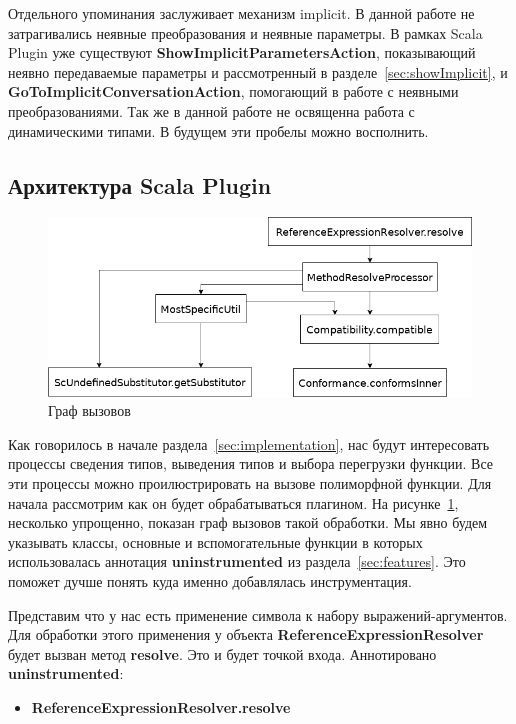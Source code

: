 Отдельного упоминания заслуживает механизм implicit.
В данной работе не затрагивались неявные преобразования и неявные параметры.
В рамках Scala Plugin уже существуют \textbf{ShowImplicitParametersAction},
показывающий неявно передаваемые параметры и рассмотренный в
разделе~\ref{sec:showImplicit}, и \textbf{GoToImplicitConversationAction},
помогающий в работе с неявными преобразованиями.
Так же в данной работе не освященна работа с динамическими типами.
В будущем эти пробелы можно восполнить.

\subsection{Архитектура Scala Plugin}
\label{sec:arch}

\begin{figure}[t]
\centering
\includegraphics[width=\textwidth]{img/call-graph}
\caption{Граф вызовов}
\label{fig:callGraph}
\end{figure}

Как говорилось в начале раздела~\ref{sec:implementation}, нас будут интересовать
процессы сведения типов, выведения типов и выбора перегрузки функции.
Все эти процессы можно проилюстрировать на вызове полиморфной функции.
Для начала рассмотрим как он будет обрабатываться плагином.
На рисунке~\ref{fig:callGraph}, несколько упрощенно, показан граф вызовов
такой обработки.
Мы явно будем указывать классы, основные и вспомогательные функции в которых
использовалась аннотация \textbf{uninstrumented} из раздела~\ref{sec:features}.
Это поможет дучше понять куда именно добавлялась инструментация.

Представим что у нас есть применение символа к набору выражений-аргументов.
Для обработки этого применения у объекта \textbf{ReferenceExpressionResolver}
будет вызван метод \textbf{resolve}.
Это и будет точкой входа.
Аннотировано \textbf{uninstrumented}:
\begin{itemize}
  \item \textbf{ReferenceExpressionResolver.resolve}
\end{itemize}

